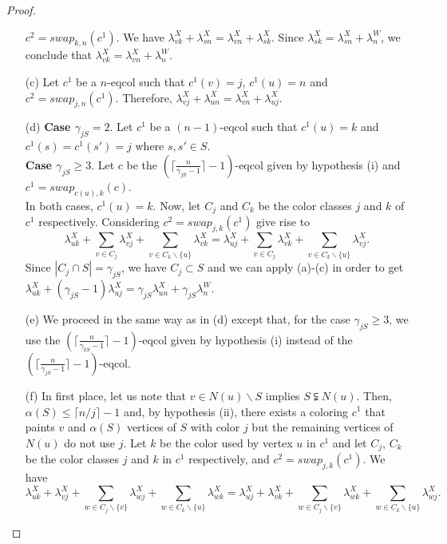 \begin{proof}
\begin{enumerate}
$c^2 = swap_{k,n}(c^1)$. We have $\lambda^X_{vk} + \lambda^X_{sn} = \lambda^X_{vn} + \lambda^X_{sk}$.
Since $\lambda^X_{sk} = \lambda^X_{sn} + \lambda^W_n$, we conclude that
$\lambda^X_{vk} = \lambda^X_{vn} + \lambda^W_n$.
\item[(c)] Let $c^1$ be a $n$-eqcol such that $c^1(v) = j$, $c^1(u) = n$ and $c^2 = swap_{j,n}(c^1)$.
Therefore, $\lambda^X_{vj} + \lambda^X_{un} = \lambda^X_{vn} + \lambda^X_{uj}$.
\item[(d)] \textbf{Case $\gamma_{jS} = 2$}. Let $c^1$ be a $(n-1)$-eqcol such that $c^1(u) = k$ and
$c^1(s) = c^1(s') = j$ where $s, s' \in S$.\\
\textbf{Case $\gamma_{jS} \geq 3$}. Let $c$ be the $(\lceil \frac{n}{\gamma_{jS} - 1} \rceil - 1)$-eqcol given
by hypothesis (i) and $c^1 = swap_{c(u),k}(c)$.\\
In both cases, $c^1(u) = k$. Now, let $C_j$ and $C_k$ be the color classes $j$
and $k$ of $c^1$ respectively. Considering $c^2 = swap_{j,k}(c^1)$ give rise to
\[ \lambda^X_{uk} + \sum_{v \in C_j} \lambda^X_{vj} + \sum_{v \in C_k \backslash \{u\}} \lambda^X_{vk} =
   \lambda^X_{uj} + \sum_{v \in C_j} \lambda^X_{vk} + \sum_{v \in C_k \backslash \{u\}} \lambda^X_{vj}. \]
Since $|C_j \cap S| = \gamma_{jS}$, we have $C_j \subset S$ and we can apply (a)-(c) in order to
get $\lambda^X_{uk} + (\gamma_{jS} - 1) \lambda^X_{uj} = \gamma_{jS} \lambda^X_{un} + \gamma_{jS} \lambda^W_n$.
\item[(e)] We proceed in the same way as in (d) except that, for the case $\gamma_{jS} \geq 3$, we use the
$(\lceil \frac{n}{\gamma_{kS} - 1} \rceil - 1)$-eqcol given by hypothesis (i) instead of the
$(\lceil \frac{n}{\gamma_{jS} - 1} \rceil - 1)$-eqcol.
\item[(f)] In first place, let us note that $v \in N(u) \backslash S$ implies $S \subsetneqq N(u)$.
Then, $\alpha(S) \leq \lceil n/j \rceil - 1$ and, by hypothesis (ii), there exists a coloring $c^1$ that paints $v$
and $\alpha(S)$ vertices of $S$ with color $j$ but the remaining vertices of $N(u)$ do not use $j$.
Let $k$ be the color used by vertex $u$ in $c^1$ and let $C_j$, $C_k$ be the color classes $j$ and $k$ in
$c^1$ respectively, and $c^2 = swap_{j,k}(c^1)$. We have
\[ \lambda^X_{uk} + \lambda^X_{vj} + \sum_{w \in C_j\backslash \{v\}} \lambda^X_{wj} +
                                    \sum_{w \in C_k \backslash \{u\}} \lambda^X_{wk} =
   \lambda^X_{uj} + \lambda^X_{vk} + \sum_{w \in C_j\backslash \{v\}} \lambda^X_{wk} +
                                    \sum_{w \in C_k \backslash \{u\}} \lambda^X_{wj}. \]

\end{enumerate}
\end{proof}
